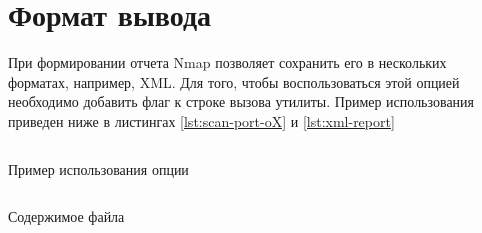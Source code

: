 \section{Формат вывода}

При формировании отчета Nmap позволяет сохранить его в нескольких форматах, например, XML. Для того, чтобы воспользоваться этой 
опцией необходимо добавить флаг  к строке вызова утилиты. Пример использования приведен ниже в листингах 
\ref{lst:scan-port-oX} и \ref{lst:xml-report}

\begin{listing}[H]
    \inputminted{console}{resources/10_scan_port_oX}
    \caption{Пример использования опции }
    \label{lst:scan-port-oX}
\end{listing}

\begin{listing}[H]
    \inputminted{xml}{resources/11_xml_report}
    \caption{Содержимое файла }
    \label{lst:xml-report}
\end{listing}